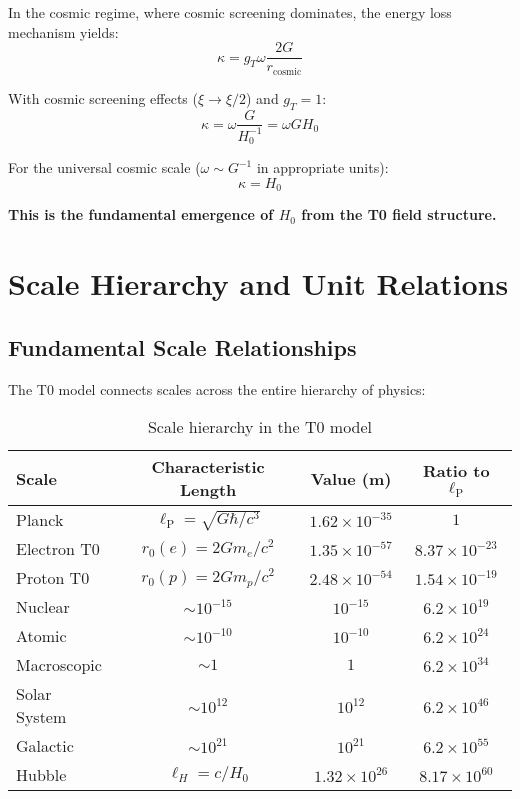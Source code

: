 \documentclass[12pt,a4paper]{article}
\newcommand{\lP}{\ell_{\text{P}}}
\newcommand{\xipar}{\xi}
\newcommand{\Hzero}{H_0}
\newcommand{\kappaparam}{\kappa}
\begin{document}
	In the cosmic regime, where cosmic screening dominates, the energy loss mechanism yields:
	\begin{equation}
		\kappaparam = g_T \omega \frac{2G}{r_{\text{cosmic}}}
	\end{equation}
	
	With cosmic screening effects ($\xipar \to \xipar/2$) and $g_T = 1$:
	\begin{equation}
		\kappaparam = \omega \frac{G}{\Hzero^{-1}} = \omega G \Hzero
	\end{equation}
	
	For the universal cosmic scale ($\omega \sim G^{-1}$ in appropriate units):
	\begin{equation}
		\boxed{\kappaparam = \Hzero}
	\end{equation}
	
	\textbf{This is the fundamental emergence of $H_0$ from the T0 field structure.}
	
	\section{Scale Hierarchy and Unit Relations}
	\label{sec:scale_hierarchy}
	
	\subsection{Fundamental Scale Relationships}
	\label{subsec:scale_relationships}
	
	The T0 model connects scales across the entire hierarchy of physics:
	
	\begin{table}[htbp]
		\centering
		\begin{tabular}{lccc}
			\toprule
			\textbf{Scale} & \textbf{Characteristic Length} & \textbf{Value (m)} & \textbf{Ratio to $\lP$} \\
			\midrule
			Planck & $\lP = \sqrt{G\hbar/c^3}$ & $1.62 \times 10^{-35}$ & $1$ \\
			Electron T0 & $r_0(e) = 2Gm_e/c^2$ & $1.35 \times 10^{-57}$ & $8.37 \times 10^{-23}$ \\
			Proton T0 & $r_0(p) = 2Gm_p/c^2$ & $2.48 \times 10^{-54}$ & $1.54 \times 10^{-19}$ \\
			Nuclear & $\sim 10^{-15}$ & $10^{-15}$ & $6.2 \times 10^{19}$ \\
			Atomic & $\sim 10^{-10}$ & $10^{-10}$ & $6.2 \times 10^{24}$ \\
			Macroscopic & $\sim 1$ & $1$ & $6.2 \times 10^{34}$ \\
			Solar System & $\sim 10^{12}$ & $10^{12}$ & $6.2 \times 10^{46}$ \\
			Galactic & $\sim 10^{21}$ & $10^{21}$ & $6.2 \times 10^{55}$ \\
			Hubble & $\ell_H = c/H_0$ & $1.32 \times 10^{26}$ & $8.17 \times 10^{60}$ \\
			\bottomrule
		\end{tabular}
		\caption{Scale hierarchy in the T0 model}
		\label{tab:scale_hierarchy}
	\end{table}
	
\end{document}
